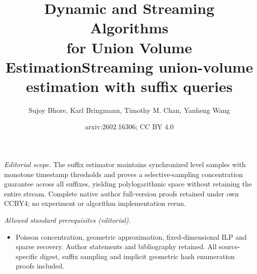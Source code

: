 \documentclass[11pt]{article}
\title{Dynamic and Streaming Algorithms\\for Union Volume Estimation}
\title{Streaming union-volume estimation with suffix queries}
\author{Sujoy Bhore, Karl Bringmann, Timothy M. Chan, Yanheng Wang}
\date{arxiv:2602.16306; CC BY 4.0}
\begin{document}
\maketitle
\noindent\textit{Editorial scope.} The suffix estimator maintains synchronized level samples with monotone timestamp thresholds and proves a selective-sampling concentration guarantee across all suffixes, yielding polylogarithmic space without retaining the entire stream. Complete native author full-version proofs retained under own CCBY4; no experiment or algorithm implementation rerun.\par\medskip
\noindent\textit{Allowed standard prerequisites (editorial).}\begin{itemize}
\item Poisson concentration, geometric approximation, fixed-dimensional ILP and sparse recovery. Author statements and bibliography retained. All source-specific digest, suffix sampling and implicit geometric hash enumeration proofs included.
\end{itemize}\medskip
\end{document}
